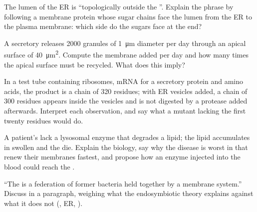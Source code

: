 \begin{exercise}[$\star\star$]\label{exo:b1:eukaryotic-cell:8}
The lumen of the ER is ``topologically outside the ''. Explain the
phrase by following a membrane protein whose sugar chains face the
lumen from the ER to the plasma membrane: which side do the sugars face
at the end?
\end{exercise}

\begin{exercise}[$\star\star$]\label{exo:b1:eukaryotic-cell:9}
A secretory  releases \qty{2000}{} granules of \qty{1}{\micro m}
diameter per day through an apical surface of \qty{40}{\micro m^2}.
Compute the membrane added per day and how many times the apical
surface must be recycled. What does this imply?
\end{exercise}

\begin{exercise}[$\star\star\star$]\label{exo:b1:eukaryotic-cell:10}
In a test tube containing ribosomes, mRNA for a secretory protein and
amino acids, the product is a chain of \qty{320}{} residues; with ER
vesicles added, a chain of \qty{300}{} residues appears inside the
vesicles and is not digested by a protease added afterwards. Interpret
each observation, and say what a mutant lacking the first twenty
residues would do.
\end{exercise}

\begin{exercise}[$\star\star\star$]\label{exo:b1:eukaryotic-cell:11}
A patient's  lack a lysosomal enzyme that degrades a lipid; the
lipid accumulates in swollen  and the  die. Explain the
 biology, say why the disease is worst in  that renew their
membranes fastest, and propose how an enzyme injected into the blood
could reach the .
\end{exercise}

\begin{exercise}[$\star\star\star$]\label{exo:b1:eukaryotic-cell:12}
``The  is a federation of former bacteria held together
by a membrane system.'' Discuss in a paragraph, weighing what the
endosymbiotic theory explains against what it does not (, ER,
).
\end{exercise}

